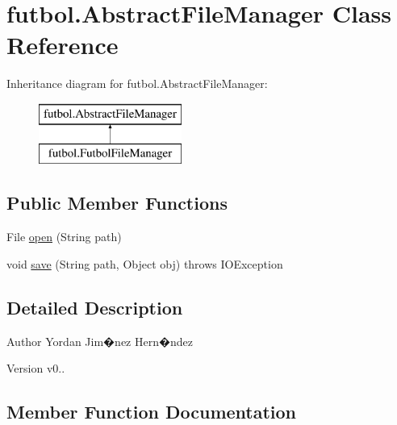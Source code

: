 \hypertarget{classfutbol_1_1_abstract_file_manager}{}\section{futbol.\+Abstract\+File\+Manager Class Reference}
\label{classfutbol_1_1_abstract_file_manager}
Inheritance diagram for futbol.\+Abstract\+File\+Manager\+:\begin{figure}[H]
\begin{center}
\leavevmode
\includegraphics[height=2.000000cm]{classfutbol_1_1_abstract_file_manager}
\end{center}
\end{figure}
\subsection*{Public Member Functions}
\begin{DoxyCompactItemize}
\item 
File \hyperlink{classfutbol_1_1_abstract_file_manager_a75ab9f401bd0bc325750f5bac8d6cb12}{open} (String path)
\item 
void \hyperlink{classfutbol_1_1_abstract_file_manager_a60a0958e94d04adaf54568b3f4a959a2}{save} (String path, Object obj)  throws I\+O\+Exception 
\end{DoxyCompactItemize}


\subsection{Detailed Description}
\begin{DoxyAuthor}{Author}
Yordan Jim�nez Hern�ndez 
\end{DoxyAuthor}
\begin{DoxyVersion}{Version}
v0.. 
\end{DoxyVersion}


\subsection{Member Function Documentation}
\hypertarget{classfutbol_1_1_abstract_file_manager_a75ab9f401bd0bc325750f5bac8d6cb12}{}\label{classfutbol_1_1_abstract_file_manager_a75ab9f401bd0bc325750f5bac8d6cb12} 
